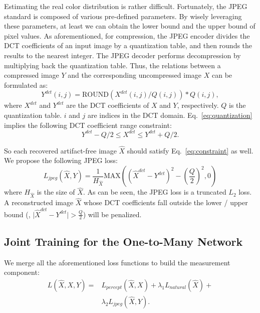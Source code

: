 \documentclass[10pt,twocolumn,letterpaper]{article}
\begin{document}
Estimating the real color distribution is rather difficult. Fortunately, the JPEG standard is composed of various pre-defined parameters. By wisely leveraging these parameters, at least we can obtain the lower bound and the upper bound of pixel values. As aforementioned, for compression, the JPEG encoder divides the DCT coefficients of an input image by a quantization table, and then rounds the results to the nearest integer. The JPEG decoder performs decompression by multiplying back the quantization table. Thus, the relations between a compressed image $Y$ and the corresponding uncompressed image $X$ can be formulated as:
\begin{equation}
Y^{dct}(i, j) = \text{ROUND}\left(X^{dct}(i, j) / Q(i, j)\right) * Q(i, j),
\label{eq:quantization}
\end{equation}
where $X^{dct}$ and $Y^{dct}$ are the DCT coefficients of $X$ and $Y$, respectively. $Q$ is the quantization table. $i$ and $j$ are indices in the DCT domain. Eq.~\eqref{eq:quantization} implies the following DCT coefficient range constraint:
\begin{equation}
Y^{dct} - Q / 2 \le X^{dct} \le Y^{dct} + Q / 2.
\label{eq:constraint}
\end{equation}

So each recovered artifact-free image $\hat{X}$ should satisfy Eq.~\eqref{eq:constraint} as well. We propose the following JPEG loss:
\begin{equation}
L_{jpeg}(\hat{X}, Y) = \frac{1}{H_{\hat{X}}}\text{MAX}\left(\left(\hat{X}^{dct} - Y^{dct}\right)^2 - \left(\frac{Q}{2}\right)^2, 0\right)
\end{equation}
where $H_{\hat{X}}$ is the size of $\hat{X}$. As can be seen, the JPEG loss is a truncated $L_2$ loss. A reconstructed image $\hat{X}$ whose DCT coefficients fall outside the lower / upper bound (\ie, $\lvert\hat{X}^{dct} - Y^{dct}\rvert > \frac{Q}{2}$) will be penalized.

\subsection{Joint Training for the One-to-Many Network}
\label{sec:joint_training}
We merge all the aforementioned loss functions to build the measurement component:
\begin{equation}
\begin{split}
L(\hat{X}, X, Y) = &L_{percept}(\hat{X}, X) + \lambda_1 L_{natural}(\hat{X}) +\\
&\lambda_2 L_{jpeg}(\hat{X}, Y).\\
\end{split}
\label{eq:final_loss}
\end{equation}
\end{document}
